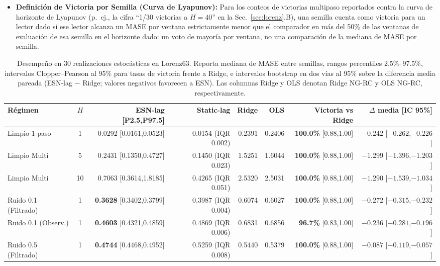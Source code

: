\documentclass[aip,cha,reprint,amsmath,amssymb]{revtex4-2}
\begin{document}
\begin{itemize}
    \item \textbf{Definición de Victoria por Semilla (Curva de Lyapunov):} Para los conteos de victorias multipaso reportados contra la curva de horizonte de Lyapunov (p.\ ej., la cifra ``1/30 victorias a $H=40$'' en la Sec.~\ref{sec:lorenz}.B), una semilla cuenta como victoria para un lector dado si ese lector alcanza un MASE por ventana estrictamente menor que el comparador en más del 50\% de las ventanas de evaluación de esa semilla en el horizonte dado: un voto de mayoría por ventana, no una comparación de la mediana de MASE por semilla.
\end{itemize}

\begin{table}[t]
\centering
\caption{Desempeño en 30 realizaciones estocásticas en Lorenz63. Reporta mediana de MASE entre semillas, rangos percentiles 2.5\%--97.5\%, intervalos Clopper--Pearson al 95\% para tasas de victoria frente a Ridge, e intervalos bootstrap en dos vías al 95\% sobre la diferencia media pareada (ESN-lag $-$ Ridge; valores negativos favorecen a ESN). Las columnas Ridge y OLS denotan Ridge NG-RC y OLS NG-RC, respectivamente.}
\label{tab:30seeds_rigorous}
\begin{ruledtabular}
\scriptsize
\setlength{\tabcolsep}{2pt}
\begin{tabular}{lcrrrrrr}
Régimen & $H$ & ESN-lag [P2.5,P97.5] & Static-lag & Ridge & OLS & Victoria vs Ridge & $\Delta$ media [IC 95\%] \\
\midrule
Limpio 1-paso & 1 & 0.0292 [0.0161,0.0523] & 0.0154 (IQR 0.002) & 0.2391 & 0.2406 & \textbf{100.0\%} [0.88,1.00] & $-0.242$ [$-0.262$,$-0.226$] \\
Limpio Multi & 5 & 0.2431 [0.1350,0.4727] & 0.1450 (IQR 0.023) & 1.5251 & 1.6044 & \textbf{100.0\%} [0.88,1.00] & $-1.299$ [$-1.396$,$-1.203$] \\
Limpio Multi & 10 & 0.7063 [0.3614,1.8185] & 0.4265 (IQR 0.051) & 2.5320 & 2.5031 & \textbf{100.0\%} [0.88,1.00] & $-1.290$ [$-1.539$,$-1.034$] \\
\midrule
Ruido 0.1 (Filtrado) & 1 & \textbf{0.3628} [0.3402,0.3799] & 0.3987 (IQR 0.004) & 0.6074 & 0.6027 & \textbf{100.0\%} [0.88,1.00] & $-0.272$ [$-0.315$,$-0.232$] \\
Ruido 0.1 (Observ.) & 1 & \textbf{0.4603} [0.4321,0.4859] & 0.4869 (IQR 0.006) & 0.6831 & 0.6856 & \textbf{96.7\%} [0.83,1.00] & $-0.236$ [$-0.281$,$-0.196$] \\
Ruido 0.5 (Filtrado) & 1 & \textbf{0.4744} [0.4468,0.4952] & 0.5259 (IQR 0.008) & 0.5440 & 0.5379 & \textbf{100.0\%} [0.88,1.00] & $-0.087$ [$-0.119$,$-0.057$] \\

\end{tabular}
\end{ruledtabular}
\end{table}
\end{document}
